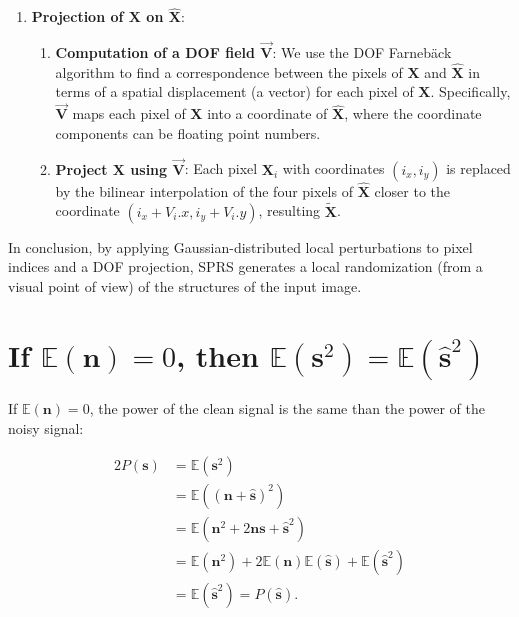 \begin{subappendices}
\begin{enumerate}
\item \textbf{Projection of $\mathbf{X}$ on $\hat{\mathbf{X}}$}:
  \begin{enumerate}
  \item \textbf{Computation of a \gls{DOF} field
      $\overrightarrow{\mathbf{V}}$}: We use the \gls{DOF} Farneb\"ack
    algorithm \cite{farneback2003two} to find a correspondence between
    the pixels of $\mathbf{X}$ and $\hat{\mathbf{X}}$ in terms of a
    spatial displacement (a vector) for each pixel of
    $\mathbf{X}$. Specifically, $\overrightarrow{\mathbf{V}}$ maps each
    pixel of $\mathbf{X}$ into a coordinate of $\hat{\mathbf{X}}$,
    where the coordinate components can be floating point numbers.
  \item \textbf{Project $\mathbf{X}$ using
      $\overrightarrow{\mathbf{V}}$}: Each pixel $\mathbf{X}_i$
    with coordinates $(i_x, i_y)$ is replaced by the bilinear
    interpolation of the four pixels of $\hat{\mathbf{X}}$ closer to
    the coordinate $(i_x+V_i.x,i_y+V_i.y)$, resulting
    $\tilde{\mathbf{X}}$.
  \end{enumerate}
\end{enumerate}

In conclusion, by applying Gaussian-distributed local perturbations to
pixel indices and a \gls{DOF} projection, \gls{SPRS} generates a local
randomization (from a visual point of view) of the structures of the
input image.


\section{If $\mathbb{E}(\mathbf{n})=0$, then $\mathbb{E}(\mathbf{s}^2)=\mathbb{E}(\hat{\mathbf{s}}^2)$}
\label{sec:power_signal}
If $\mathbb{E}(\mathbf{n})=0$, the power of the clean signal is the
same than the power of the noisy signal:

\begin{alignat*}{2}
  P(\mathbf{s}) & = \mathbb{E}(\mathbf{s}^2) \\
                & = \mathbb{E}\left((\mathbf{n}+\hat{\mathbf{s}})^2\right) \\
                & = \mathbb{E}(\mathbf{n}^2+2\mathbf{n}\mathbf{s}+\hat{\mathbf{s}}^2) \\
                & = \mathbb{E}(\mathbf{n}^2) + 2\mathbb{E}(\mathbf{n})\mathbb{E}(\hat{\mathbf{s}}) + \mathbb{E}(\hat{\mathbf{s}}^2) \\
                & = \mathbb{E}(\hat{\mathbf{s}}^2) = P(\hat{\mathbf{s}}).
\end{alignat*}


\end{subappendices}
